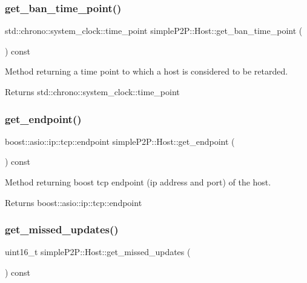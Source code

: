 \subsubsection{\texorpdfstring{get\+\_\+ban\+\_\+time\+\_\+point()}{get\_ban\_time\_point()}}
{\footnotesize\ttfamily std\+::chrono\+::system\+\_\+clock\+::time\+\_\+point simple\+P2\+P\+::\+Host\+::get\+\_\+ban\+\_\+time\+\_\+point (\begin{DoxyParamCaption}{ }\end{DoxyParamCaption}) const}



Method returning a time point to which a host is considered to be retarded. 

\begin{DoxyReturn}{Returns}
std\+::chrono\+::system\+\_\+clock\+::time\+\_\+point 
\end{DoxyReturn}
\mbox{\label{classsimpleP2P_1_1Host_a25780ee00b380a84ad0a3312bfa635cb}} 
\subsubsection{\texorpdfstring{get\+\_\+endpoint()}{get\_endpoint()}}
{\footnotesize\ttfamily boost\+::asio\+::ip\+::tcp\+::endpoint simple\+P2\+P\+::\+Host\+::get\+\_\+endpoint (\begin{DoxyParamCaption}{ }\end{DoxyParamCaption}) const}



Method returning boost tcp endpoint (ip address and port) of the host. 

\begin{DoxyReturn}{Returns}
boost\+::asio\+::ip\+::tcp\+::endpoint 
\end{DoxyReturn}
\mbox{\label{classsimpleP2P_1_1Host_a408c8c8ddcc1f6d9ee966ec73fe812d3}} 
\subsubsection{\texorpdfstring{get\+\_\+missed\+\_\+updates()}{get\_missed\_updates()}}
{\footnotesize\ttfamily uint16\+\_\+t simple\+P2\+P\+::\+Host\+::get\+\_\+missed\+\_\+updates (\begin{DoxyParamCaption}{ }\end{DoxyParamCaption}) const}



